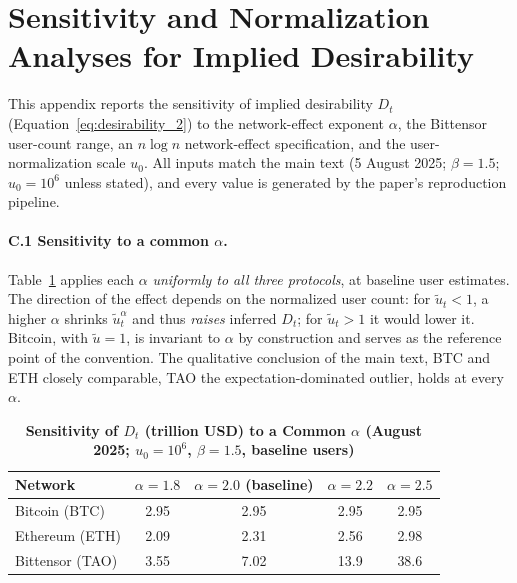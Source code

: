 \documentclass[12pt]{article}
\begin{document}
\newpage
\section{Sensitivity and Normalization Analyses for Implied Desirability}
\label{appendix:alpha_sensitivity}

This appendix reports the sensitivity of implied desirability \(D_t\) (Equation~\ref{eq:desirability_2}) to the network-effect exponent \(\alpha\), the Bittensor user-count range, an \( n \log n \) network-effect specification, and the user-normalization scale \( u_0 \). All inputs match the main text (5 August 2025; \( \beta = 1.5 \); \( u_0 = 10^6 \) unless stated), and every value is generated by the paper's reproduction pipeline.

\paragraph{C.1 Sensitivity to a common \(\alpha\).}
Table~\ref{tab:alpha_sensitivity} applies each \(\alpha\) \emph{uniformly to all three protocols}, at baseline user estimates. The direction of the effect depends on the normalized user count: for \( \tilde{u}_t < 1 \), a higher \(\alpha\) shrinks \( \tilde{u}_t^{\alpha} \) and thus \emph{raises} inferred \( D_t \); for \( \tilde{u}_t > 1 \) it would lower it. Bitcoin, with \( \tilde{u} = 1 \), is invariant to \(\alpha\) by construction and serves as the reference point of the convention. The qualitative conclusion of the main text, BTC and ETH closely comparable, TAO the expectation-dominated outlier, holds at every \(\alpha\).

\begin{table}[H]
\centering
\caption{\textbf{Sensitivity of \(D_t\) (trillion USD) to a Common \(\alpha\) (August 2025; \( u_0 = 10^6 \), \( \beta = 1.5 \), baseline users)}}
\label{tab:alpha_sensitivity}
\renewcommand{\arraystretch}{1.3}
\begin{tabular}{@{}lcccc@{}}
\toprule
\rowcolor{gray!15}
\textbf{Network} & \(\alpha = 1.8\) & \(\alpha = 2.0\) (baseline) & \(\alpha = 2.2\) & \(\alpha = 2.5\) \\
\midrule
Bitcoin (BTC)   & 2.95 & 2.95 & 2.95 & 2.95 \\
Ethereum (ETH)  & 2.09 & 2.31 & 2.56 & 2.98 \\
Bittensor (TAO) & 3.55 & 7.02 & 13.9 & 38.6 \\
\bottomrule
\end{tabular}
\end{table}
\end{document}
